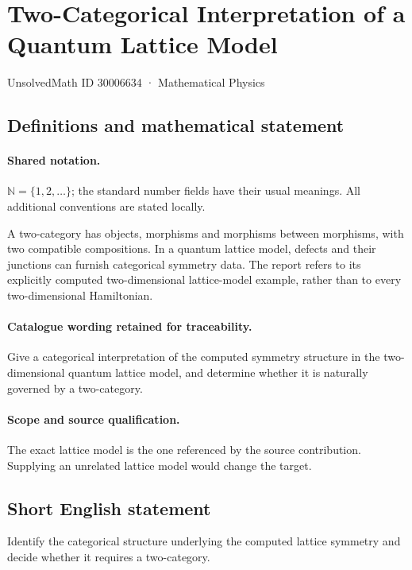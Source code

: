 \documentclass[11pt]{article}
\begin{document}
\setcounter{section}{30006633}
\section{Two-Categorical Interpretation of a Quantum Lattice Model}\label{30006634}
{\small UnsolvedMath ID 30006634 · Mathematical Physics}
\subsection{Definitions and mathematical statement}

\paragraph{Shared notation.}$\mathbb N=\{1,2,\ldots\}$; the standard number fields have their usual meanings. All additional conventions are stated locally.


A two-category has objects, morphisms and morphisms between morphisms, with two compatible compositions. In a quantum lattice model, defects and their junctions can furnish categorical symmetry data. The report refers to its explicitly computed two-dimensional lattice-model example, rather than to every two-dimensional Hamiltonian.

\paragraph{Catalogue wording retained for traceability.}
Give a categorical interpretation of the computed symmetry structure in the two-dimensional quantum lattice model, and determine whether it is naturally governed by a two-category.

\paragraph{Scope and source qualification.}The exact lattice model is the one referenced by the source contribution. Supplying an unrelated lattice model would change the target.
\subsection{Short English statement}
Identify the categorical structure underlying the computed lattice symmetry and decide whether it requires a two-category.
\end{document}
